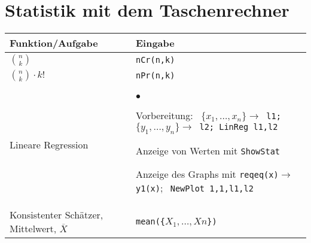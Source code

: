 \section{Statistik mit dem Taschenrechner}

\begin{center}
\begin{tabular}{|p{4cm}|p{11cm}|}
\hline
\textbf{Funktion/Aufgabe} & \textbf{Eingabe} \\
\hline

$\binom{n}{k}$ & \tt{nCr(n,k)} \\
\hline
$\binom{n}{k}\cdot k!$ & \tt{nPr(n,k)} \\
\hline

Lineare Regression &     
\begin{list}{$\bullet$}{\setlength{\itemsep}{0cm}
	\setlength{\parsep}{0cm} \setlength{\topsep}{0cm}}  
	\item Vorbereitung:\newline
		\texttt{
			$\{x_1, \ldots, x_n\} \rightarrow$ l1;
			$\{y_1, \ldots, y_n\} \rightarrow$ l2;
			LinReg l1,l2}
	 \item Anzeige von Werten mit \newline \texttt{ShowStat}
	 \item Anzeige des Graphs mit \newline
	 	\texttt{reqeq(x)}$\rightarrow$\texttt{y1(x)}$; \;$
	    \texttt{NewPlot 1,1,l1,l2}
\end{list} \\
\hline

Konsistenter Schätzer, Mittelwert, $\overline{X}$ &
\tt{mean(\{}$X_1,\ldots,Xn$\tt{\})} \\
\hline


\end{tabular}
\end{center}